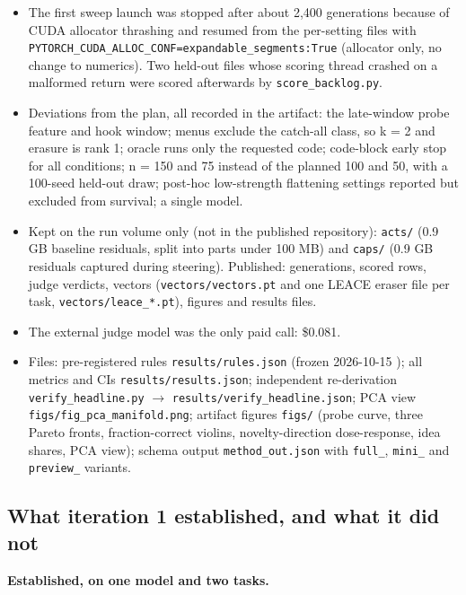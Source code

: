 \documentclass[11pt,letterpaper]{article}
\begin{document}
\begin{itemize}
\item The first sweep launch was stopped after about 2,400 generations because of CUDA allocator thrashing and resumed from the per-setting files with \texttt{PYTORCH\_\allowbreak{}CUDA\_\allowbreak{}ALLOC\_\allowbreak{}CONF=\allowbreak{}expandable\_\allowbreak{}segments:\allowbreak{}True} (allocator only, no change to numerics). Two held-out files whose scoring thread crashed on a malformed return were scored afterwards by \texttt{score\_\allowbreak{}backlog.py}.
\item Deviations from the plan, all recorded in the artifact: the late-window probe feature and hook window; menus exclude the catch-all class, so k = 2 and erasure is rank 1; oracle runs only the requested code; code-block early stop for all conditions; n = 150 and 75 instead of the planned 100 and 50, with a 100-seed held-out draw; post-hoc low-strength flattening settings reported but excluded from survival; a single model.
\item Kept on the run volume only (not in the published repository): \texttt{acts/} (0.9 GB baseline residuals, split into parts under 100 MB) and \texttt{caps/} (0.9 GB residuals captured during steering). Published: generations, scored rows, judge verdicts, vectors (\texttt{vectors/vectors.pt} and one LEACE eraser file per task, \texttt{vectors/leace\_\allowbreak{}*.pt}), figures and results files.
\item The external judge model was the only paid call: \$0.081.
\item Files: pre-registered rules \texttt{results/rules.json} (frozen 2026-10-15 ); all metrics and CIs \texttt{results/results.json}; independent re-derivation \texttt{verify\_\allowbreak{}headline.py} \ensuremath{\rightarrow} \texttt{results/verify\_\allowbreak{}headline.json}; PCA view \texttt{figs/fig\_\allowbreak{}pca\_\allowbreak{}manifold.png}; artifact figures \texttt{figs/} (probe curve, three Pareto fronts, fraction-correct violins, novelty-direction dose-response, idea shares, PCA view); schema output \texttt{method\_\allowbreak{}out.json} with \texttt{full\_\allowbreak{}}, \texttt{mini\_\allowbreak{}} and \texttt{preview\_\allowbreak{}} variants.
\end{itemize}
\subsection{What iteration 1 established, and what it did not}
\textbf{Established, on one model and two tasks.}
\end{document}
